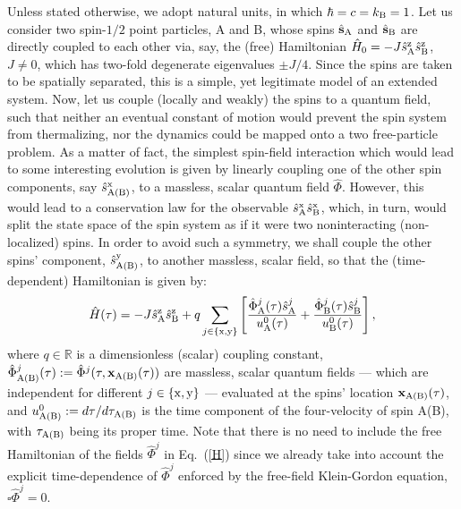 \documentclass[]{nature}
\begin{document}
Unless stated otherwise, we adopt
natural units, in which $\hbar = c = k_{\rm B} = 1$.
Let us consider two  spin-$1/2$ point particles, A and B, whose spins $\hat{\bf{s}}_{\rm A} $ and $\hat{\bf{s}}_{\rm B}$ are directly coupled 
to each other  via, say, the (free) Hamiltonian $\hat H_0 = -J \hat{s}_{\rm A}^{\rm z} \hat{s}^{\rm z}_{\rm B}$, $J \neq 0$, which has two-fold degenerate eigenvalues 
$\pm J/4$.  Since the spins are taken to be spatially separated, this is a simple, yet legitimate model of an extended system. 
Now, let us couple (locally and weakly) the spins to a quantum  field, such that neither an eventual 
constant of motion would prevent the spin system from thermalizing, nor the dynamics could
be mapped onto a two free-particle problem. As a matter of fact, the simplest spin-field interaction which would lead to some interesting evolution 
is given by linearly coupling one of the other spin components, say $\hat s_{\rm A(B)}^{\rm x}$, to
a massless, scalar quantum field $\hat \Phi$. However, this would lead to a conservation law
for the observable $\hat s_{\rm A}^{\rm x} \hat s_{\rm B}^{\rm x}$, which, in turn, would split the state space of the spin system as if it were two noninteracting (non-localized) spins.
In order to avoid such a symmetry, we shall couple the other spins' component, $\hat s_{\rm A(B)}^{\rm y}$, to another massless, scalar field, so that the (time-dependent) 
Hamiltonian is given by:
\begin{eqnarray}
\hat{H} (\tau)= -J \hat{s}_{\rm A}^{\rm z} \hat{s}^{\rm z}_{\rm B} +q\sum_{j\in\{{\rm x},{\rm y}\}}\left[\frac{\hat{\Phi}^j_{\rm A}(\tau) \hat{s}^j_{\rm A}}{u_{\rm A}^0(\tau)}+\frac{\hat{\Phi}^j_{\rm B}(\tau) \hat{s}^j_{\rm B}}{u_{\rm B}^0(\tau)}\right],
\label{H}
\end{eqnarray}
where $q \in {\mathbb R}$ is a dimensionless (scalar) coupling constant, 
$\hat{\Phi}^j_{\rm A(B)}(\tau) := \hat{\Phi}^j(\tau,\bf{x}_{\rm A(B)}(\tau))$ are 
massless, scalar quantum fields --- which are independent for
different $j\in \{{\rm x},{\rm y}\}$ --- evaluated at the spins' location $\bf{x}_{\rm A(B)}(\tau)$, and
$u^0_{\rm A(B)}:= d\tau/d\tau_{\rm A(B)}$ is the time component of the four-velocity of spin A(B), with $\tau_{\rm A(B)}$ being its proper time.
Note that there is no 
need to include the free Hamiltonian of the fields $\hat \Phi^j$ in Eq.~(\ref{H})  since we already take into account
the explicit time-dependence of $\hat \Phi^j$ enforced by the free-field Klein-Gordon equation, $\square \hat \Phi^j = 0$.
\end{document}

